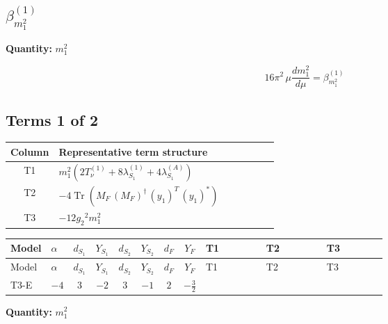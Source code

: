 \documentclass[8pt]{article}
\begin{document}
\begin{landscape}
\section*{$\beta_{m_1^2}^{(1)}$}
\noindent\textbf{Quantity: }$m_1^2$\par\smallskip
\[16\pi^2\,\mu\frac{d m_1^2}{d\mu}=\beta_{m_1^2}^{(1)}\]
\subsection*{Terms 1 of 2}
\begin{center}
\begin{tabular}{@{}c >{\raggedright\arraybackslash}p{0.82\linewidth}@{}}
\toprule
Column & Representative term structure \\
\midrule
T1 & \(\displaystyle {m_1^2} (2 T_{\nu}^{(1)}+8 {\lambda_{S_1}^{(1)}}+4 {\lambda_{S_1}^{(A)}})\) \\
\midrule
T2 & \(\displaystyle -4 \operatorname{Tr}\!\left({M_F}\,\left({M_F}\right)^{\dagger}\,\left({y_1}\right)^{T}\,\left({y_1}\right)^{*}\right)\) \\
\midrule
T3 & \(\displaystyle -12 {g_2}^2 {m_1^2}\) \\
\midrule
\bottomrule
\end{tabular}
\end{center}
\smallskip
\tiny
\begin{longtable}{@{}llcccccc >{\raggedright\arraybackslash}p{0.21\linewidth} >{\raggedright\arraybackslash}p{0.21\linewidth} >{\raggedright\arraybackslash}p{0.21\linewidth}@{}}
\toprule
Model & $\alpha$ & $d_{S_1}$ & $Y_{S_1}$ & $d_{S_2}$ & $Y_{S_2}$ & $d_F$ & $Y_F$ & T1 & T2 & T3 \\
\midrule
\endfirsthead
\toprule
Model & $\alpha$ & $d_{S_1}$ & $Y_{S_1}$ & $d_{S_2}$ & $Y_{S_2}$ & $d_F$ & $Y_F$ & T1 & T2 & T3 \\
\midrule
\endhead
T3-E & $-4$ & $3$ & $-2$ & $3$ & $-1$ & $2$ & $-\frac{3}{2}$ & \scriptsize\adjustbox{max width=\linewidth}{$\begin{gathered} {m_1^2} (2 T_{\nu}^{(1)}+8 {\lambda_{S_1}^{(1)}}+4 {\lambda_{S_1}^{(A)}})\end{gathered}$} & \scriptsize\adjustbox{max width=\linewidth}{$\begin{gathered} -4 \operatorname{Tr}\!\left({M_F}\,\left({M_F}\right)^{\dagger}\,\left({y_1}\right)^{T}\,\left({y_1}\right)^{*}\right)\end{gathered}$} & \scriptsize\adjustbox{max width=\linewidth}{$\begin{gathered} -12 {g_2}^2 {m_1^2}\end{gathered}$} \\
\midrule
\bottomrule
\end{longtable}
\clearpage
\noindent\textbf{Quantity: }$m_1^2$\par\smallskip

\end{landscape}
\end{document}
